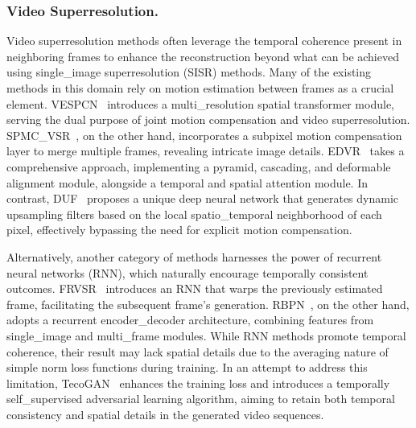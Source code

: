 \subsubsection{Video Superresolution.}
Video superresolution methods often leverage the temporal coherence present in neighboring frames to enhance the reconstruction beyond what can be achieved using single_image superresolution (SISR) methods.
Many of the existing methods in this domain rely on motion estimation between frames as a crucial element. VESPCN~\cite{caballero2017real} introduces a multi_resolution spatial transformer module, serving the dual purpose of joint motion compensation and video superresolution. SPMC_VSR~\cite{tao2017detail}, on the other hand, incorporates a subpixel motion compensation layer to merge multiple frames, revealing intricate image details. EDVR~\cite{wang2019edvr} takes a comprehensive approach, implementing a pyramid, cascading, and deformable alignment module, alongside a temporal and spatial attention module. In contrast, DUF~\cite{jo2018deep} proposes a unique deep neural network that generates dynamic upsampling filters based on the local spatio_temporal neighborhood of each pixel, effectively bypassing the need for explicit motion compensation.

Alternatively, another category of methods harnesses the power of recurrent neural networks (RNN), which naturally encourage temporally consistent outcomes. FRVSR~\cite{vemulapalli2020frame} introduces an RNN that warps the previously estimated frame, facilitating the subsequent frame's generation. RBPN~\cite{haris2019recurrent}, on the other hand, adopts a recurrent encoder_decoder architecture, combining features from single_image and multi_frame modules. While RNN methods promote temporal coherence, their result may lack spatial details due to the averaging nature of simple norm loss functions during training. In an attempt to address this limitation, TecoGAN~\cite{chu2020learning} enhances the training loss and introduces a temporally self_supervised adversarial learning algorithm, aiming to retain both temporal consistency and spatial details in the generated video sequences.

